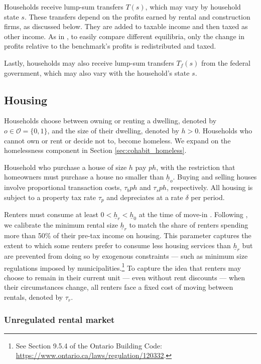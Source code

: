 \documentclass[parskip=full]{article}
\begin{document}
Households receive lump-sum transfers $T(s)$, which may vary by household state $s$. These transfers depend on the profits earned by rental and construction firms, as discussed below. They are added to taxable income and then taxed as other income. As in \citet{kkk-2021}, to easily compare different equilibria, only the change in profits relative to the benchmark's profits is redistributed and taxed.

Lastly, households may also receive lump-sum transfers $T_f(s)$ from the federal government, which may also vary with the household’s state $s$.

\subsection{Housing}\label{subsection:housing_choice}

Households choose between owning or renting a dwelling, denoted by $o \in \mathcal{O}=\{0,1\}$, and the size of their dwelling, denoted by $h>0$. Households who cannot own or rent or decide not to, become homeless. We expand on the homelessness component in Section \ref{sec:cohabit_homeless}.

Household who purchase a house of size $h$ pay $p h$, with the restriction that homeowners must purchase a house no smaller than $\underline{h}_{o}$. Buying and selling houses involve proportional transaction costs, $\tau_{b} p h$ and $\tau_{s} p h$, respectively. All housing is subject to a property tax rate $\tau_{p}$ and depreciates at a rate $\delta$ per period. 

Renters must consume at least $0<\underline{h}_{r}<\underline{h}_{0}$ at the time of move-in \citep{gervais,sommeretal-2013,sommersullivan-2017,kaplanetal-2019,rs-2023}. Following \citet{rs-2023}, we calibrate the minimum rental size $\underline{h}_{r}$ to match the share of renters spending more than 50\% of their pre-tax income on housing. This parameter captures the extent to which some renters prefer to consume less housing services than $\underline{h}_{r}$ but are prevented from doing so by exogenous constraints — such as minimum size regulations imposed by municipalities.\footnote{See Section 9.5.4 of the Ontario Building Code: \url{https://www.ontario.ca/laws/regulation/120332}.} To capture the idea that renters may choose to remain in their current unit — even without rent discounts — when their circumstances change, all renters face a fixed cost of moving between rentals, denoted by $\tau_r$.

\subsubsection{Unregulated rental market}
\end{document}

